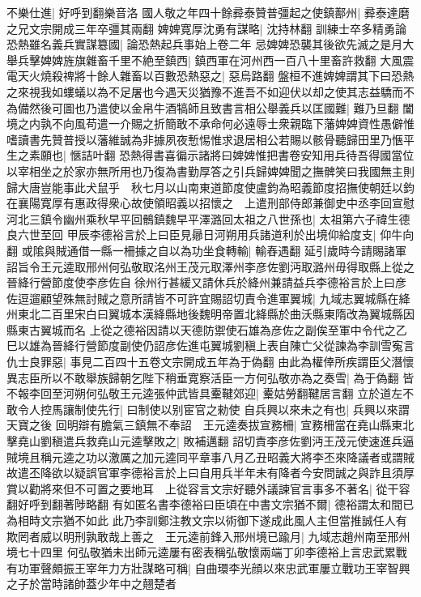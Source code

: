 不樂仕進|{
	好呼到翻樂音洛}
國人敬之年四十餘彛泰贊普彊起之使鎮鄯州|{
	彛泰達磨之兄文宗開成三年卒彊其兩翻}
婢婢寛厚沈勇有謀略|{
	沈持林翻}
訓練士卒多精勇論恐熱雖名義兵實謀簒國|{
	論恐熱起兵事始上卷二年}
忌婢婢恐襲其後欲先滅之是月大舉兵擊婢婢旌旗雜畜千里不絶至鎮西|{
	鎮西軍在河州西一百八十里畜許救翻}
大風震電天火燒殺禆將十餘人雜畜以百數恐熱惡之|{
	惡烏路翻}
盤桓不進婢婢謂其下曰恐熱之來視我如螻蟻以為不足屠也今遇天災猶豫不進吾不如迎伏以却之使其志益驕而不為備然後可圖也乃遣使以金帛牛酒犒師且致書言相公舉義兵以匡國難|{
	難乃旦翻}
闔境之内孰不向風苟遣一介賜之折簡敢不承命何必遠辱士衆親臨下藩婢婢資性愚僻惟嗜讀書先贊普授以藩維誠為非據夙夜慙惕惟求退居相公若賜以骸骨聽歸田里乃愜平生之素願也|{
	愜詰叶翻}
恐熱得書喜徧示諸將曰婢婢惟把書卷安知用兵待吾得國當位以宰相坐之於家亦無所用也乃復為書勤厚答之引兵歸婢婢聞之撫髀笑曰我國無主則歸大唐豈能事此犬鼠乎　秋七月以山南東道節度使盧鈞為昭義節度招撫使朝廷以鈞在襄陽寛厚有惠政得衆心故使領昭義以招懷之　上遣刑部侍郎兼御史中丞李回宣慰河北三鎮令幽州乘秋早平回鶻鎮魏早平澤潞回太祖之八世孫也|{
	太祖第六子禕生德良六世至回}
甲辰李德裕言於上曰臣見曏日河朔用兵諸道利於出境仰給度支|{
	仰牛向翻}
或隂與賊通借一縣一柵據之自以為功坐食轉輸|{
	輸舂遇翻}
延引歲時今請賜諸軍詔旨令王元逵取邢州何弘敬取洺州王茂元取澤州李彦佐劉沔取潞州毋得取縣上從之晉絳行營節度使李彦佐自徐州行甚緩又請休兵於絳州兼請益兵李德裕言於上曰彦佐逗遛顧望殊無討賊之意所請皆不可許宜賜詔切責令進軍翼城|{
	九域志翼城縣在絳州東北二百里宋白曰翼城本漢絳縣地後魏明帝置北絳縣於曲沃縣東隋改為翼城縣因縣東古翼城而名}
上從之德裕因請以天德防禦使石雄為彦佐之副俟至軍中令代之乙巳以雄為晉絳行營節度副使仍詔彦佐進屯翼城劉稹上表自陳亡父從諫為李訓雪寃言仇士良罪惡|{
	事見二百四十五卷文宗開成五年為于偽翻}
由此為權倖所疾謂臣父潛懷異志臣所以不敢舉族歸朝乞陛下稍垂寛察活臣一方何弘敬亦為之奏雪|{
	為于偽翻}
皆不報李回至河朔何弘敬王元逵張仲武皆具櫜鞬郊迎|{
	櫜姑勞翻鞬居言翻}
立於道左不敢令人控馬讓制使先行|{
	曰制使以别宦官之勑使}
自兵興以來未之有也|{
	兵興以來謂天寶之後}
回明辯有膽氣三鎮無不奉詔　王元逵奏拔宣務柵|{
	宣務柵當在堯山縣東北}
擊堯山劉稹遣兵救堯山元逵擊敗之|{
	敗補邁翻}
詔切責李彦佐劉沔王茂元使速進兵逼賊境且稱元逵之功以激厲之加元逵同平章事八月乙丑昭義大將李丕來降議者或謂賊故遣丕降欲以疑誤官軍李德裕言於上曰自用兵半年未有降者今安問誠之與詐且須厚賞以勸將來但不可置之要地耳　上從容言文宗好聽外議諫官言事多不著名|{
	從干容翻好呼到翻著陟略翻}
有如匿名書李德裕曰臣頃在中書文宗猶不爾|{
	德裕謂太和間已為相時文宗猶不如此}
此乃李訓鄭注教文宗以術御下遂成此風人主但當推誠任人有欺罔者威以明刑孰敢哉上善之　王元逵前鋒入邢州境已踰月|{
	九域志趙州南至邢州境七十四里}
何弘敬猶未出師元逵屢有密表稱弘敬懷兩端丁卯李德裕上言忠武累戰有功軍聲頗振王宰年力方壯謀略可稱|{
	自曲環李光顔以來忠武軍屢立戰功王宰智興之子於當時諸帥蓋少年中之翹楚者}
